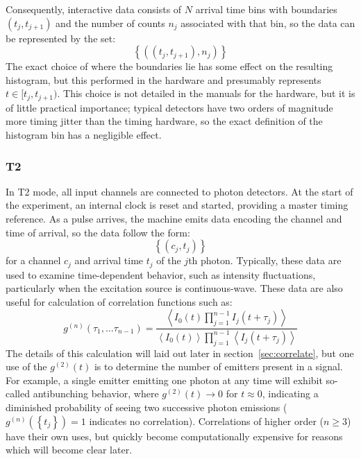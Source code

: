 \documentclass{article}
\newcommand{\braces}[1]{\ensuremath{\left\lbrace #1 \right\rbrace}}
\newcommand{\angles}[1]{\ensuremath{\left\langle #1 \right\rangle}}
\newcommand{\gn}[1]{\ensuremath{g^{(#1)}}}
\begin{document}
Consequently, interactive data consists of $N$ arrival time bins with boundaries $(t_{j}, t_{j+1})$ and the number of counts $n_{j}$ associated with that bin, so the data can be represented by the set:
\begin{equation}
\braces{((t_{j}, t_{j+1}), n_{j})}
\end{equation}
The exact choice of where the boundaries lie has some effect on the resulting histogram, but this performed in the hardware and presumably represents $t\in[t_{j}, t_{j+1})$. This choice is not detailed in the manuals for the hardware, but it is of little practical importance; typical detectors have two orders of magnitude more timing jitter than the timing hardware, so the exact definition of the histogram bin has a negligible effect.

\subsubsection{T2}
In T2 mode, all input channels are connected to photon detectors. At the start of the experiment, an internal clock is reset and started, providing a master timing reference. As a pulse arrives, the machine emits data encoding the channel and time of arrival, so the data follow the form:
\begin{equation}
\braces{(c_{j}, t_{j})}
\end{equation}
for a channel $c_{j}$ and arrival time $t_{j}$ of the $j$th photon. Typically, these data are used to examine time-dependent behavior, such as intensity fluctuations, particularly when the excitation source is continuous-wave. These data are also useful for calculation of correlation functions such as:
\begin{equation}
\gn{n}(\tau_{1}, \ldots \tau_{n-1}) = \frac
	{\angles{I_{0}(t)\prod_{j=1}^{n-1}{I_{j}(t+\tau_{j})}}}
	{\angles{I_{0}(t)}\prod_{j=1}^{n-1}{\angles{I_{j}(t+\tau_{j})}}}
\end{equation}
The details of this calculation will laid out later in section~\ref{sec:correlate}, but one use of the $g^{(2)}(t)$ is to determine the number of emitters present in a signal. For example, a single emitter emitting one photon at any time will exhibit so-called antibunching behavior, where $g^{(2)}(t)\rightarrow 0$ for $t\approx 0$, indicating a diminished probability of seeing two successive photon emissions ($g^{(n)}(\braces{t_{j}})=1$ indicates no correlation). Correlations of higher order ($n\ge 3$) have their own uses, but quickly become computationally expensive for reasons which will become clear later.
\end{document}
